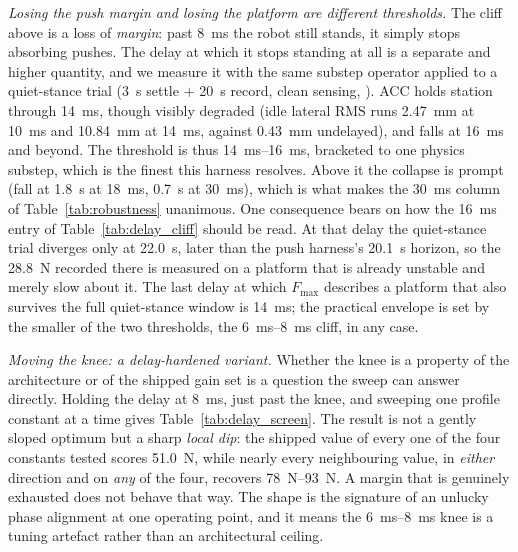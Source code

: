 \documentclass[a4paper,fleqn]{cas-dc}
\begin{document}
\emph{Losing the push margin and losing the platform are different thresholds.}
The cliff above is a loss of \emph{margin}: past \SI{8}{ms} the robot still stands, it simply stops absorbing pushes. The delay at which it stops standing at all is a separate and higher quantity, and we measure it with the same substep operator applied to a quiet-stance trial (\SI{3}{s} settle $+$ \SI{20}{s} record, clean sensing, ). ACC holds station through \SI{14}{ms}, though visibly degraded (idle lateral RMS runs \SI{2.47}{mm} at \SI{10}{ms} and \SI{10.84}{mm} at \SI{14}{ms}, against \SI{0.43}{mm} undelayed), and falls at \SI{16}{ms} and beyond. The threshold is thus \SIrange{14}{16}{ms}, bracketed to one physics substep, which is the finest this harness resolves. Above it the collapse is prompt (fall at \SI{1.8}{s} at \SI{18}{ms}, \SI{0.7}{s} at \SI{30}{ms}), which is what makes the \SI{30}{ms} column of Table~\ref{tab:robustness} unanimous.
One consequence bears on how the \SI{16}{ms} entry of Table~\ref{tab:delay_cliff} should be read. At that delay the quiet-stance trial diverges only at \SI{22.0}{s}, later than the push harness's \SI{20.1}{s} horizon, so the \SI{28.8}{N} recorded there is measured on a platform that is already unstable and merely slow about it. The last delay at which $F_{\max}$ describes a platform that also survives the full quiet-stance window is \SI{14}{ms}; the practical envelope is set by the smaller of the two thresholds, the \SIrange{6}{8}{ms} cliff, in any case.

\emph{Moving the knee: a delay-hardened variant.}
Whether the knee is a property of the architecture or of the shipped gain set is a question the sweep can answer directly. Holding the delay at \SI{8}{ms}, just past the knee, and sweeping one profile constant at a time gives Table~\ref{tab:delay_screen}. The result is not a gently sloped optimum but a sharp \emph{local dip}: the shipped value of every one of the four constants tested scores \SI{51.0}{N}, while nearly every neighbouring value, in \emph{either} direction and on \emph{any} of the four, recovers \SIrange{78}{93}{N}. A margin that is genuinely exhausted does not behave that way. The shape is the signature of an unlucky phase alignment at one operating point, and it means the \SIrange{6}{8}{ms} knee is a tuning artefact rather than an architectural ceiling.
\end{document}
